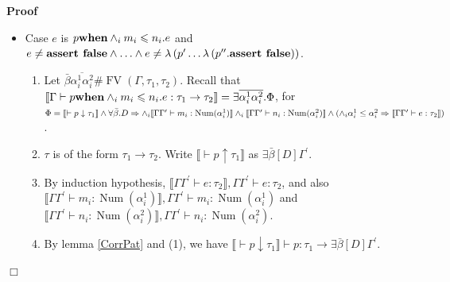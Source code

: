 \documentclass{article}
\newcommand{\tmname}[1]{\textsc{#1}}
\newcommand{\tmop}[1]{\ensuremath{\operatorname{#1}}}
\newcommand{\tmstrong}[1]{\textbf{#1}}
\newenvironment{proof}{\noindent\textbf{Proof\ }}{\hspace*{\fill}$\Box$\medskip}
\begin{document}
\begin{proof}
\begin{itemize}
\begin{enumerate}
      \item By (4), (5), (1), and {\tmname{Clause}}, we obtain $\llbracket
      \Gamma \vdash p.e : \tau \rrbracket, \Gamma \vdash p.e : \tau$.
    \end{enumerate}
    \item Case $e$ is $p \text{{\tmstrong{when}}} \wedge_i m_i \leqslant n_i
    .e$ and $e \neq \text{{\tmstrong{assert false}}} \wedge \ldots \wedge e
    \neq \lambda \left( p^{\prime} \ldots \lambda \left( p^{\prime\prime} .
    \text{{\tmstrong{assert false}}} \right) \right)$.
    \begin{enumerate}
      \item Let $\bar{\beta} \overline{\alpha^1_i \alpha^2_i} \# \tmop{FV}
      (\Gamma, \tau_1, \tau_2)$. Recall that $\left\llbracket \Gamma \vdash p
      \text{{\tmstrong{when}}} \wedge_i m_i \leqslant n_i .e : \tau_1
      \rightarrow \tau_2 \right\rrbracket = \exists \overline{\alpha^1_i
      \alpha^2_i} . \Phi$, for $\Phi = \\
      \llbracket \vdash p \downarrow \tau_1 \rrbracket \wedge \forall
      \bar{\beta} .D \Rightarrow \wedge_i \llbracket \Gamma \Gamma^{\prime}
      \vdash m_i : \tmop{Num} (\alpha^1_i) \rrbracket \wedge_i \\
      \llbracket \Gamma \Gamma^{\prime} \vdash n_i : \tmop{Num} (\alpha^2_i)
      \rrbracket \wedge (\wedge_i \alpha^1_i \leq \alpha^2_i \Rightarrow
      \llbracket \Gamma \Gamma^{\prime} \vdash e : \tau_2 \rrbracket)$.
      
      \item $\tau$ is of the form $\tau_1 \rightarrow \tau_2$. Write
      $\llbracket \vdash p \uparrow \tau_1 \rrbracket$ as $\exists \bar{\beta}
      [D] \Gamma^{\prime}$.
      
      \item By induction hypothesis, $\llbracket \Gamma \Gamma^{\prime} \vdash
      e : \tau_2 \rrbracket, \Gamma \Gamma^{\prime} \vdash e : \tau_2$, and
      also $\llbracket \Gamma \Gamma^{\prime} \vdash m_i : \tmop{Num}
      (\alpha_i^1) \rrbracket, \Gamma \Gamma^{\prime} \vdash m_i : \tmop{Num}
      (\alpha_i^1)$ and $\llbracket \Gamma \Gamma^{\prime} \vdash n_i :
      \tmop{Num} (\alpha_i^2) \rrbracket, \Gamma \Gamma^{\prime} \vdash n_i :
      \tmop{Num} (\alpha_i^2)$.
      
      \item By lemma \ref{CorrPat} and (1), we have $\llbracket \vdash p
      \downarrow \tau_1 \rrbracket \vdash p : \tau_1 \longrightarrow \exists
      \bar{\beta} [D] \Gamma^{\prime}$.
      

\end{enumerate}
\end{itemize}
\end{proof}
\end{document}
